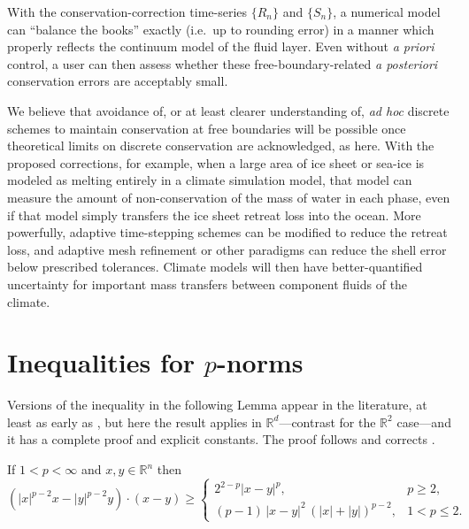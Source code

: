 \documentclass[final,leqno,onefignum,onetabnum]{siamltex1213bueler}
\newcommand\RR{\mathbb{R}}
\begin{document}
With the conservation-correction time-series $\{R_n\}$ and $\{S_n\}$, a numerical model can ``balance the books'' exactly (i.e.~up to rounding error) in a manner which properly reflects the continuum model of the fluid layer.  Even without \emph{a priori} control, a user can then assess whether these free-boundary-related \emph{a posteriori} conservation errors are acceptably small.

We believe that avoidance of, or at least clearer understanding of, \emph{ad hoc} discrete schemes to maintain conservation at free boundaries will be possible once theoretical limits on discrete conservation are acknowledged, as here.  With the proposed corrections, for example, when a large area of ice sheet or sea-ice is modeled as melting entirely in a climate simulation model, that model can measure the amount of non-conservation of the mass of water in each phase, even if that model simply transfers the ice sheet retreat loss into the ocean.  More powerfully, adaptive time-stepping schemes can be modified to reduce the retreat loss, and adaptive mesh refinement or other paradigms can reduce the shell error below prescribed tolerances.  Climate models will then have better-quantified uncertainty for important mass transfers between component fluids of the climate.







\appendix

\section{Inequalities for $p$-norms}   \label{app:pinequalities}  Versions of the inequality in the following Lemma appear in the literature, at least as early as \cite{GlowinskiMarroco1975}, but here the result applies in $\RR^d$---contrast \cite{BarrettLiu1993,GlowinskiMarroco1975} for the $\RR^2$ case---and it has a complete proof and explicit constants.  The proof follows and corrects \cite[Appendix A]{Peral1997}.

\begin{lemma}  \label{lem:pinequality}  If $1<p<\infty$ and $x,y\in\RR^n$ then
\begin{equation}
\left(|x|^{p-2} x - |y|^{p-2} y\right)\cdot(x-y) \ge
   \begin{cases}
       2^{2-p} |x-y|^p, & p\ge 2, \\
       (p-1)\, |x-y|^2 \, \left(|x|+|y|\right)^{p-2}, & 1 < p \le 2.
   \end{cases} \label{eq:pinequality}
\end{equation}
\end{lemma}
\end{document}
